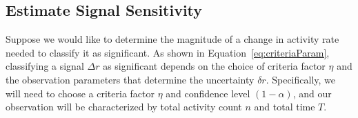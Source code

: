 \documentclass{article}
\begin{document}
%
%
%



\subsection{Estimate Signal Sensitivity}
\label{ex:3}

Suppose we would like to determine the magnitude of a change in activity rate needed to 
classify it as significant. 
As shown in Equation~\ref{eq:criteriaParam}, 
classifying a signal $\Delta r$ as significant depends on the choice of criteria factor 
$\eta$ and the observation parameters that determine the uncertainty $\delta r$. 
Specifically, we will need to choose a criteria factor $\eta$ and confidence level 
$(1-\alpha)$, and our observation will be characterized by total activity count $n$ 
and total time $T$.
\end{document}
